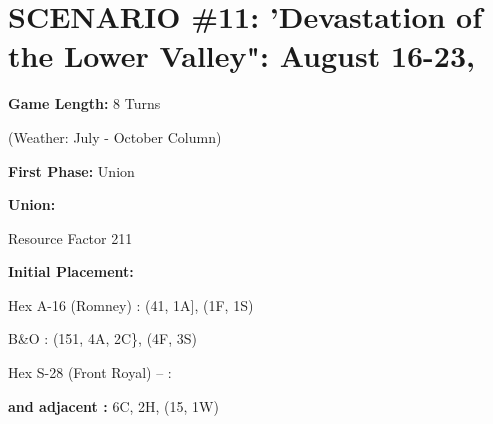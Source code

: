 \section{SCENARIO \#11: 'Devastation of the Lower Valley": August 16-23,
}


\begin{scenariodata}
\textbf{Game Length:} 8 Turns\\
\end{scenariodata}

\begin{scenariodata}
(Weather: July - October Column)\\
\end{scenariodata}

\begin{scenariodata}
\textbf{First Phase:} Union\\
\end{scenariodata}

\begin{scenariodata}
\textbf{Union:}\\
\end{scenariodata}

\begin{scenariodata}
Resource Factor 211\\
\end{scenariodata}

\begin{scenariodata}
\textbf{Initial Placement:}\\
\end{scenariodata}

\begin{scenariodata}
Hex A-16 (Romney) : (41, 1A], (1F, 1S)\\
\end{scenariodata}

\begin{scenariodata}
B\&O : (151, 4A, 2C\}, (4F, 3S)\\
\end{scenariodata}

\begin{scenariodata}
Hex S-28 (Front Royal) -- :\\
\end{scenariodata}

\begin{scenariodata}
\textbf{and adjacent :} 6C, 2H, (15, 1W)\\
\end{scenariodata}


